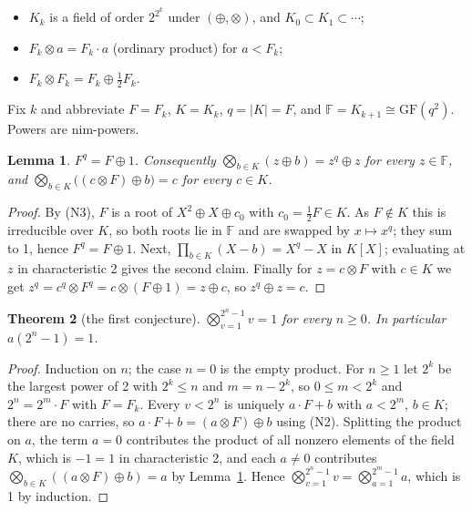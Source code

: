 \documentclass[11pt,a4paper]{article}
\theoremstyle{plain}
\newtheorem{theorem}{Theorem}
\newtheorem{lemma}[theorem]{Lemma}
\theoremstyle{definition}
\begin{document}
\begin{itemize}
\item[(N1)] $K_{k}$ is a field of order $2^{2^{k}}$ under $(\oplus,\otimes)$, and
$K_{0}\subset K_{1}\subset\cdots$;
\item[(N2)] $F_{k}\otimes a=F_{k}\cdot a$ (ordinary product) for $a<F_{k}$;
\item[(N3)] $F_{k}\otimes F_{k}=F_{k}\oplus\tfrac12F_{k}$.
\end{itemize}

Fix $k$ and abbreviate $F=F_{k}$, $K=K_{k}$, $q=|K|=F$, and
$\mathbb{F}=K_{k+1}\cong\mathrm{GF}(q^{2})$. Powers are nim-powers.

\begin{lemma}\label{lem:coset}
$F^{q}=F\oplus1$. Consequently $\bigotimes_{b\in K}(z\oplus b)=z^{q}\oplus z$ for every
$z\in\mathbb{F}$, and $\bigotimes_{b\in K}\bigl((c\otimes F)\oplus b\bigr)=c$ for every
$c\in K$.
\end{lemma}

\begin{proof}
By (N3), $F$ is a root of $X^{2}\oplus X\oplus c_{0}$ with $c_{0}=\tfrac12F\in K$. As
$F\notin K$ this is irreducible over $K$, so both roots lie in $\mathbb{F}$ and are swapped
by $x\mapsto x^{q}$; they sum to 1, hence $F^{q}=F\oplus1$. Next,
$\prod_{b\in K}(X-b)=X^{q}-X$ in $K[X]$; evaluating at $z$ in characteristic 2 gives the
second claim. Finally for $z=c\otimes F$ with $c\in K$ we get
$z^{q}=c^{q}\otimes F^{q}=c\otimes(F\oplus1)=z\oplus c$, so $z^{q}\oplus z=c$.
\end{proof}

\begin{theorem}[the first conjecture]\label{thm:first}
$\bigotimes_{v=1}^{2^{n}-1}v=1$ for every $n\ge0$. In particular $a(2^{n}-1)=1$.
\end{theorem}

\begin{proof}
Induction on $n$; the case $n=0$ is the empty product. For $n\ge1$ let $2^{k}$ be the
largest power of 2 with $2^{k}\le n$ and $m=n-2^{k}$, so $0\le m<2^{k}$ and
$2^{n}=2^{m}\cdot F$ with $F=F_{k}$. Every $v<2^{n}$ is uniquely $a\cdot F+b$ with
$a<2^{m}$, $b\in K$; there are no carries, so $a\cdot F+b=(a\otimes F)\oplus b$ using (N2).
Splitting the product on $a$, the term $a=0$ contributes the product of all nonzero
elements of the field $K$, which is $-1=1$ in characteristic 2, and each $a\ne0$
contributes $\bigotimes_{b\in K}((a\otimes F)\oplus b)=a$ by Lemma~\ref{lem:coset}. Hence
$\bigotimes_{v=1}^{2^{n}-1}v=\bigotimes_{a=1}^{2^{m}-1}a$, which is 1 by induction.
\end{proof}
\end{document}
